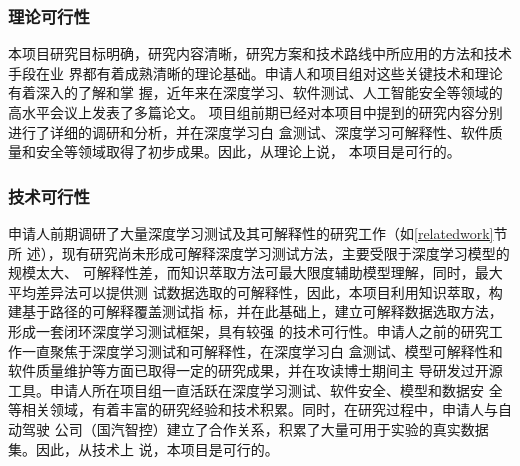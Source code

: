 \subsubsection{理论可行性}

本项目研究目标明确，研究内容清晰，研究方案和技术路线中所应用的方法和技术手段在业
界都有着成熟清晰的理论基础。申请人和项目组对这些关键技术和理论有着深入的了解和掌
握，近年来在深度学习、软件测试、人工智能安全等领域的高水平会议上发表了多篇论文。
项目组前期已经对本项目中提到的研究内容分别进行了详细的调研和分析，并在深度学习白
盒测试、深度学习可解释性、软件质量和安全等领域取得了初步成果。因此，从理论上说，
本项目是可行的。

\subsubsection{技术可行性}

申请人前期调研了大量深度学习测试及其可解释性的研究工作（如\ref{relatedwork}节所
述），现有研究尚未形成可解释深度学习测试方法，主要受限于深度学习模型的规模太大、
可解释性差，而知识萃取方法可最大限度辅助模型理解，同时，最大平均差异法可以提供测
试数据选取的可解释性，因此，本项目利用知识萃取，构建基于路径的可解释覆盖测试指
标，并在此基础上，建立可解释数据选取方法，形成一套闭环深度学习测试框架，具有较强
的技术可行性。申请人之前的研究工作一直聚焦于深度学习测试和可解释性，在深度学习白
盒测试、模型可解释性和软件质量维护等方面已取得一定的研究成果，并在攻读博士期间主
导研发过开源工具。申请人所在项目组一直活跃在深度学习测试、软件安全、模型和数据安
全等相关领域，有着丰富的研究经验和技术积累。同时，在研究过程中，申请人与自动驾驶
公司（国汽智控）建立了合作关系，积累了大量可用于实验的真实数据集。因此，从技术上
说，本项目是可行的。

\iffalse
\subsubsection{团队合理性}

项目组在深度学习测试和模型安全具有一定的基础，积累了丰富的研究经验，在重要国际会
议上发表了多篇高水平论文，项目在开源软件开发和管理等方面也有丰富的积累，可为本项
目测试框架研发和开源推广提供保障。项目组梯队完善，队伍具有凝聚力和创造力，项目组
成员每周定期讨论，有着良好的科研氛围，同时对本项目的研究内容具有浓厚的研究兴趣。
申请人有着长期广泛的国内外合作者，申请人与合作导师Hua Ji教授，本学院的刘哲理教
授、范玲玲副教授，天津大学的陈森副教授等均有密切合作，他们一直活跃在软件测试、软
件安全和模型安全等领域的学术前沿，可为本项目提供技术指导。此外，申请人与联合培养
时的导师新加坡国立大学教授Siau-Cheng Kho一直保持密切联系，Kho教授长期从事软件安
全和深度学习方面的研究，是软件工程和软件安全方面非常活跃的科学家；申请人与新加坡
南洋理工大学教授Yang Liu合作密切，Liu教授在软件工程、开源软件分析域管理等方面有
着丰富且深入的研究，是相关领域的引领者。两位国际知名专家可为本项目提供技术指导。
\fi